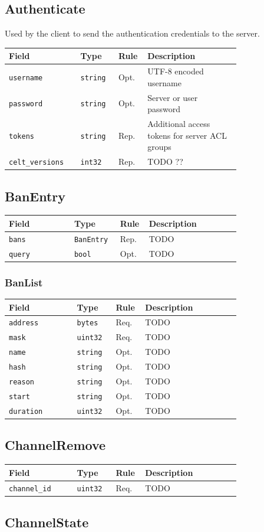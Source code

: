 \documentclass[11pt]{article} %
\newenvironment{mumbleMessageEx}
{%
	\small
	\renewcommand\arraystretch{1.5}
	\begin{tabular}{p{0.25\linewidth}p{0.13\linewidth}p{0.05\linewidth}p{0.35\linewidth}}
	Field & Type & Rule & Description \\
	\hline
}
{%
	\end{tabular}
	\renewcommand\arraystretch{1.0}
}
\newcommand{\mumbleMessageExItem}[4]{ \texttt{#1} & \texttt{#2} & #3 & #4 \\ }
\begin{document}
\subsection{Authenticate}
\label{msg:authenticate}

Used by the client to send the authentication credentials to the server.

\begin{mumbleMessageEx}
\mumbleMessageExItem{username}{string}{Opt.}{UTF-8 encoded username}
\mumbleMessageExItem{password}{string}{Opt.}{Server or user password}
\mumbleMessageExItem{tokens}{string}{Rep.}{Additional access tokens for server ACL groups}
\mumbleMessageExItem{celt\_versions}{int32}{Rep.}{TODO ??}
\end{mumbleMessageEx}

\subsection{BanEntry}

\begin{mumbleMessageEx}
\mumbleMessageExItem{bans}{BanEntry}{Rep.}{TODO}
\mumbleMessageExItem{query}{bool}{Opt.}{TODO}
\end{mumbleMessageEx}

\subsubsection{BanList}

\begin{mumbleMessageEx}
\mumbleMessageExItem{address}{bytes}{Req.}{TODO}
\mumbleMessageExItem{mask}{uint32}{Req.}{TODO}
\mumbleMessageExItem{name}{string}{Opt.}{TODO}
\mumbleMessageExItem{hash}{string}{Opt.}{TODO}
\mumbleMessageExItem{reason}{string}{Opt.}{TODO}
\mumbleMessageExItem{start}{string}{Opt.}{TODO}
\mumbleMessageExItem{duration}{uint32}{Opt.}{TODO}
\end{mumbleMessageEx}

\subsection{ChannelRemove}

\begin{mumbleMessageEx}
\mumbleMessageExItem{channel\_id}{uint32}{Req.}{TODO}
\end{mumbleMessageEx}

\subsection{ChannelState}
\label{msg:channelState}
\end{document}
